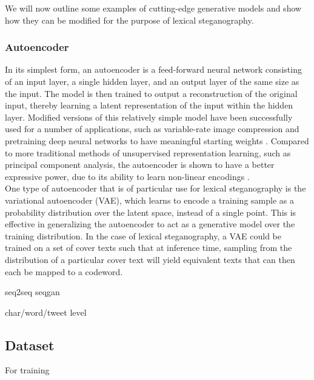 \documentclass[11pt,a4paper]{article}
\begin{document}
  \nocite{covertweet1}

  \noindent We will now outline some examples of cutting-edge generative models and show how they can be modified for the purpose of lexical steganography.


  \subsubsection *{Autoencoder}
  In its simplest form, an autoencoder is a feed-forward neural network consisting of an input layer, a single hidden layer, and an output layer of the same size as the input. The model is then trained to output a reconstruction of the original input, thereby learning a latent representation of the input within the hidden layer. Modified versions of this relatively simple model have been successfully used for a number of applications, such as variable-rate image compression \cite{autoencimagecomp} and pretraining deep neural networks to have meaningful starting weights \cite{autoencstacking}. Compared to more traditional methods of unsupervised representation learning, such as principal component analysis, the autoencoder is shown to have a better expressive power, due to its ability to learn non-linear encodings \cite{goodfellow}.\\
  \indent One type of autoencoder that is of particular use for lexical steganography is the variational autoencoder (VAE), which learns to encode a training sample as a probability distribution over the latent space, instead of a single point. This is effective in generalizing the autoencoder to act as a generative model over the training distribution. In the case of lexical steganography, a VAE could be trained on a set of cover texts such that at inference time, sampling from the distribution of a particular cover text will yield equivalent texts that can then each be mapped to a codeword.
  
  seq2seq
  seqgan

  char/word/tweet level






\subsection *{Dataset}
  For training 


\end{document}

